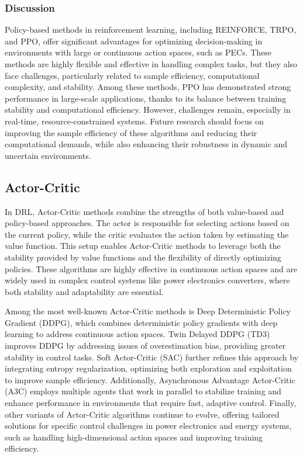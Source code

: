 \subsubsection{Discussion}

Policy-based methods in reinforcement learning, including REINFORCE, TRPO, and PPO, offer significant advantages for optimizing decision-making in environments with large or continuous action spaces, such as PECs. These methods are highly flexible and effective in handling complex tasks, but they also face challenges, particularly related to sample efficiency, computational complexity, and stability. Among these methods, PPO has demonstrated strong performance in large-scale applications, thanks to its balance between training stability and computational efficiency. However, challenges remain, especially in real-time, resource-constrained systems. Future research should focus on improving the sample efficiency of these algorithms and reducing their computational demands, while also enhancing their robustness in dynamic and uncertain environments. 

\subsection{Actor-Critic}
\label{sec:ac_methods}

In DRL, Actor-Critic methods combine the strengths of both value-based and policy-based approaches. The actor is responsible for selecting actions based on the current policy, while the critic evaluates the action taken by estimating the value function. This setup enables Actor-Critic methods to leverage both the stability provided by value functions and the flexibility of directly optimizing policies. These algorithms are highly effective in continuous action spaces and are widely used in complex control systems like power electronics converters, where both stability and adaptability are essential.

Among the most well-known Actor-Critic methods is Deep Deterministic Policy Gradient (DDPG), which combines deterministic policy gradients with deep learning to address continuous action spaces. Twin Delayed DDPG (TD3) improves DDPG by addressing issues of overestimation bias, providing greater stability in control tasks. Soft Actor-Critic (SAC) further refines this approach by integrating entropy regularization, optimizing both exploration and exploitation to improve sample efficiency. Additionally, Asynchronous Advantage Actor-Critic (A3C) employs multiple agents that work in parallel to stabilize training and enhance performance in environments that require fast, adaptive control. Finally, other variants of Actor-Critic algorithms continue to evolve, offering tailored solutions for specific control challenges in power electronics and energy systems, such as handling high-dimensional action spaces and improving training efficiency.


